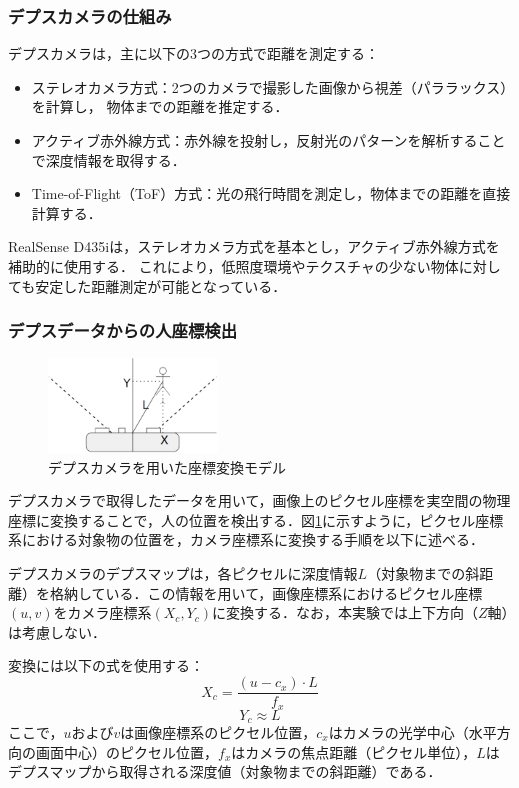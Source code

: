 \subsubsection{デプスカメラの仕組み}
デプスカメラは，主に以下の3つの方式で距離を測定する：
\begin{itemize}
    \item ステレオカメラ方式：2つのカメラで撮影した画像から視差（パララックス）を計算し，
          物体までの距離を推定する．
    \item アクティブ赤外線方式：赤外線を投射し，反射光のパターンを解析することで深度情報を取得する．
    \item Time-of-Flight（ToF）方式：光の飛行時間を測定し，物体までの距離を直接計算する．
\end{itemize}

RealSense D435iは，ステレオカメラ方式を基本とし，アクティブ赤外線方式を補助的に使用する．
これにより，低照度環境やテクスチャの少ない物体に対しても安定した距離測定が可能となっている．

\subsubsection{デプスデータからの人座標検出}

\begin{figure}[h]
    \centering
    \includegraphics[width=0.4\textwidth]{figure/rialsens_man.pdf}
    \caption{デプスカメラを用いた座標変換モデル}
    \label{fig:coordinate_conversion}
\end{figure}

デプスカメラで取得したデータを用いて，画像上のピクセル座標を実空間の物理座標に変換することで，人の位置を検出する．図\ref{fig:coordinate_conversion}に示すように，ピクセル座標系における対象物の位置を，カメラ座標系に変換する手順を以下に述べる．

デプスカメラのデプスマップは，各ピクセルに深度情報$L$（対象物までの斜距離）を格納している．この情報を用いて，画像座標系におけるピクセル座標$(u, v)$をカメラ座標系$(X_c, Y_c)$に変換する．なお，本実験では上下方向（$Z$軸）は考慮しない．

変換には以下の式を使用する：
\begin{equation}
    X_c = \frac{(u - c_x) \cdot L}{f_x}
    \label{eq:xc}
\end{equation}
\begin{equation}
    Y_c \approx L
    \label{eq:yc}
\end{equation}
ここで，$u$および$v$は画像座標系のピクセル位置，$c_x$はカメラの光学中心（水平方向の画面中心）のピクセル位置，$f_x$はカメラの焦点距離（ピクセル単位），$L$はデプスマップから取得される深度値（対象物までの斜距離）である．

